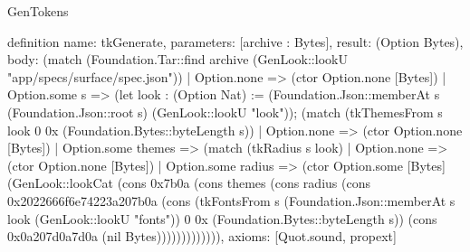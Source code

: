 \begin{lexlean}{GenTokens}
\begin{semanticmodule}
definition{
  name: tkGenerate,
  parameters: [archive : Bytes],
  result: (Option Bytes),
  body: (match (Foundation.Tar::find archive (GenLook::lookU "app/specs/surface/spec.json"))
    | Option.none => (ctor Option.none [Bytes])
    | Option.some s => (let look : (Option Nat) := (Foundation.Json::memberAt s (Foundation.Json::root s) (GenLook::lookU "look")); (match (tkThemesFrom s look 0 0x (Foundation.Bytes::byteLength s))
      | Option.none => (ctor Option.none [Bytes])
      | Option.some themes => (match (tkRadius s look)
        | Option.none => (ctor Option.none [Bytes])
        | Option.some radius => (ctor Option.some [Bytes] (GenLook::lookCat (cons 0x7b0a (cons themes (cons radius (cons 0x2022666f6e74223a207b0a (cons (tkFontsFrom s (Foundation.Json::memberAt s look (GenLook::lookU "fonts")) 0 0x (Foundation.Bytes::byteLength s)) (cons 0x0a207d0a7d0a (nil Bytes))))))))))))),
  axioms: [Quot.sound, propext]
}
\end{semanticmodule}
\end{lexlean}
